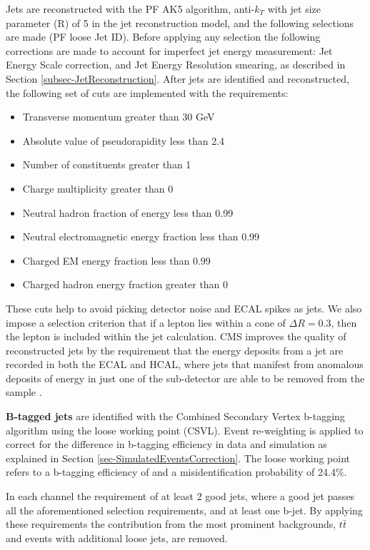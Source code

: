 Jets are reconstructed with the PF AK5 algorithm, anti-$k_T$ with jet size parameter (R) of 5 in the jet reconstruction model, and the following selections are made (PF loose Jet ID). Before applying any selection the following corrections are made to account for imperfect jet energy measurement: Jet Energy Scale correction, and Jet Energy Resolution smearing, as described in Section \ref{subsec-JetReconstruction}. After jets are identified and reconstructed, the following set of cuts are implemented with the requirements:

\begin{itemize}
	\item Transverse momentum greater than 30 GeV
	\item Absolute value of pseudorapidity less than 2.4
	\item Number of constituents greater than 1
	\item Charge multiplicity greater than 0
	\item Neutral hadron fraction of energy less than 0.99
	\item Neutral electromagnetic energy fraction less than 0.99
	\item Charged EM energy fraction less than 0.99
	\item Charged hadron energy fraction greater than 0
\end{itemize}

These cuts help to avoid picking detector noise and ECAL spikes as jets. We also impose a selection criterion that if a lepton lies within a cone of $\Delta R = 0.3$, then the lepton is included within the jet calculation. CMS improves the quality of reconstructed jets by the requirement that the energy deposits from a jet are recorded in both the ECAL and HCAL, where jets that manifest from anomalous deposits of energy in just one of the sub-detector are able to be removed from the sample \cite{CMS-PAS-JME-10-003}.

 \textbf{B-tagged jets} are identified with the Combined Secondary Vertex b-tagging algorithm using the loose working point (CSVL). Event re-weighting is applied to correct for the difference in b-tagging efficiency in data and simulation as explained in Section \ref{sec-SimulatedEventsCorrection}. The loose working point refers to a b-tagging efficiency of  and a misidentification probability of 24.4\%.

 In each channel the requirement of at least 2 good jets, where a good jet passes all the aforementioned selection requirements, and at least one b-jet. By applying these requirements the contribution from the most prominent backgrounds, $t\bar{t}$ and events with additional loose jets, are removed. 

